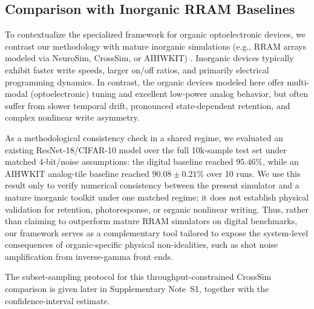 \subsection{Comparison with Inorganic RRAM Baselines}
\label{subsec:inorganic-comparison}

To contextualize the specialized framework for organic optoelectronic devices, we contrast our methodology with mature inorganic simulations (e.g., RRAM arrays modeled via NeuroSim, CrossSim, or AIHWKIT) \citep{peng2020dnnneurosim,crosssim2024,rasch2021aihwkit}. Inorganic devices typically exhibit faster write speeds, larger on/off ratios, and primarily electrical programming dynamics. In contrast, the organic devices modeled here offer multi-modal (optoelectronic) tuning and excellent low-power analog behavior, but often suffer from slower temporal drift, pronounced state-dependent retention, and complex nonlinear write asymmetry.

As a methodological consistency check in a shared regime, we evaluated an existing ResNet-18/CIFAR-10 model over the full 10k-sample test set under matched 4-bit/noise assumptions: the digital baseline reached \(95.46\%\), while an AIHWKIT analog-tile baseline reached \(90.08\pm0.21\%\) over 10 runs. We use this result only to verify numerical consistency between the present simulator and a mature inorganic toolkit under one matched regime; it does not establish physical validation for retention, photoresponse, or organic nonlinear writing. Thus, rather than claiming to outperform mature RRAM simulators on digital benchmarks, our framework serves as a complementary tool tailored to expose the system-level consequences of organic-specific physical non-idealities, such as shot noise amplification from inverse-gamma front ends.

The subset-sampling protocol for this throughput-constrained CrossSim comparison
is given later in Supplementary Note~S1, together with the confidence-interval
estimate.

